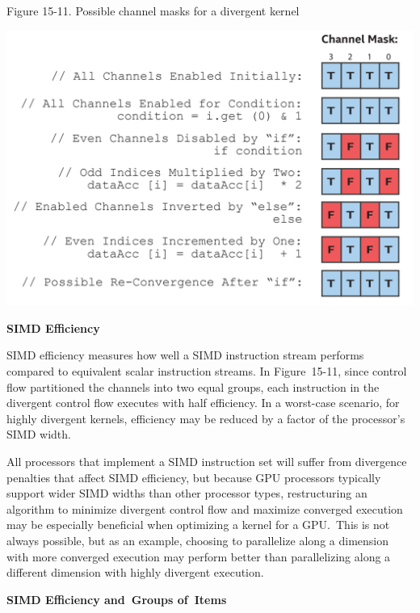 \hspace*{\fill} \par %
Figure 15-11. Possible channel masks for a divergent kernel
\begin{center}
	\includegraphics[width=1.0\textwidth]{content/chapter-15/images/8}
\end{center}

\hspace*{\fill} \par %
\textbf{SIMD Efficiency}

SIMD efficiency measures how well a SIMD instruction stream performs compared to equivalent scalar instruction streams. In Figure 15-11, since control flow partitioned the channels into two equal groups, each instruction in the divergent control flow executes with half efficiency. In a worst-case scenario, for highly divergent kernels, efficiency may be reduced by a factor of the processor’s SIMD width.\par

All processors that implement a SIMD instruction set will suffer from divergence penalties that affect SIMD efficiency, but because GPU processors typically support wider SIMD widths than other processor types, restructuring an algorithm to minimize divergent control flow and maximize converged execution may be especially beneficial when optimizing a kernel for a GPU. This is not always possible, but as an example, choosing to parallelize along a dimension with more converged execution may perform better than parallelizing along a different dimension with highly divergent execution.\par

\hspace*{\fill} \par %
\textbf{SIMD Efficiency and Groups of Items}

